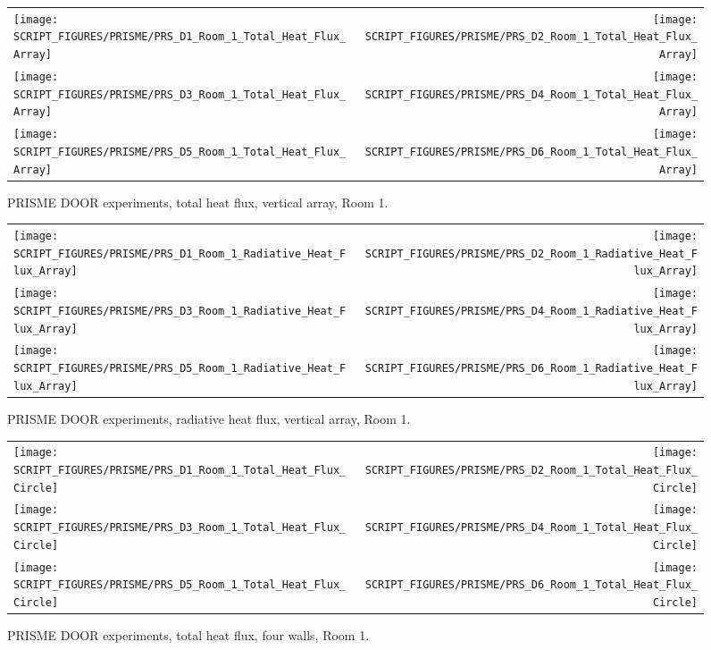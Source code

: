 \begin{figure}[!ht]
\begin{tabular*}{\textwidth}{l@{\extracolsep{\fill}}r}
\texttt{[image: SCRIPT\_FIGURES/PRISME/PRS\_D1\_Room\_1\_Total\_Heat\_Flux\_Array]} &
\texttt{[image: SCRIPT\_FIGURES/PRISME/PRS\_D2\_Room\_1\_Total\_Heat\_Flux\_Array]} \\
\texttt{[image: SCRIPT\_FIGURES/PRISME/PRS\_D3\_Room\_1\_Total\_Heat\_Flux\_Array]} &
\texttt{[image: SCRIPT\_FIGURES/PRISME/PRS\_D4\_Room\_1\_Total\_Heat\_Flux\_Array]} \\
\texttt{[image: SCRIPT\_FIGURES/PRISME/PRS\_D5\_Room\_1\_Total\_Heat\_Flux\_Array]} &
\texttt{[image: SCRIPT\_FIGURES/PRISME/PRS\_D6\_Room\_1\_Total\_Heat\_Flux\_Array]}
\end{tabular*}
\caption[PRISME DOOR experiments, total heat flux, vertical array, Room 1]{PRISME DOOR experiments, total heat flux, vertical array, Room 1.}
\label{PRISME_Wall_Array_THF_Room_1}
\end{figure}

\newpage

\begin{figure}[p]
\begin{tabular*}{\textwidth}{l@{\extracolsep{\fill}}r}
\texttt{[image: SCRIPT\_FIGURES/PRISME/PRS\_D1\_Room\_1\_Radiative\_Heat\_Flux\_Array]} &
\texttt{[image: SCRIPT\_FIGURES/PRISME/PRS\_D2\_Room\_1\_Radiative\_Heat\_Flux\_Array]} \\
\texttt{[image: SCRIPT\_FIGURES/PRISME/PRS\_D3\_Room\_1\_Radiative\_Heat\_Flux\_Array]} &
\texttt{[image: SCRIPT\_FIGURES/PRISME/PRS\_D4\_Room\_1\_Radiative\_Heat\_Flux\_Array]} \\
\texttt{[image: SCRIPT\_FIGURES/PRISME/PRS\_D5\_Room\_1\_Radiative\_Heat\_Flux\_Array]} &
\texttt{[image: SCRIPT\_FIGURES/PRISME/PRS\_D6\_Room\_1\_Radiative\_Heat\_Flux\_Array]}
\end{tabular*}
\caption[PRISME DOOR experiments, radiative heat flux, vertical array, Room 1]{PRISME DOOR experiments, radiative heat flux, vertical array, Room 1.}
\label{PRISME_Wall_Array_RHF_Room_1}
\end{figure}

\begin{figure}[p]
\begin{tabular*}{\textwidth}{l@{\extracolsep{\fill}}r}
\texttt{[image: SCRIPT\_FIGURES/PRISME/PRS\_D1\_Room\_1\_Total\_Heat\_Flux\_Circle]} &
\texttt{[image: SCRIPT\_FIGURES/PRISME/PRS\_D2\_Room\_1\_Total\_Heat\_Flux\_Circle]} \\
\texttt{[image: SCRIPT\_FIGURES/PRISME/PRS\_D3\_Room\_1\_Total\_Heat\_Flux\_Circle]} &
\texttt{[image: SCRIPT\_FIGURES/PRISME/PRS\_D4\_Room\_1\_Total\_Heat\_Flux\_Circle]} \\
\texttt{[image: SCRIPT\_FIGURES/PRISME/PRS\_D5\_Room\_1\_Total\_Heat\_Flux\_Circle]} &
\texttt{[image: SCRIPT\_FIGURES/PRISME/PRS\_D6\_Room\_1\_Total\_Heat\_Flux\_Circle]}
\end{tabular*}
\caption[PRISME DOOR experiments, total heat flux, four walls, Room 1]{PRISME DOOR experiments, total heat flux, four walls, Room 1.}
\label{PRISME_Wall_Circle_THF_Room_1}
\end{figure}

